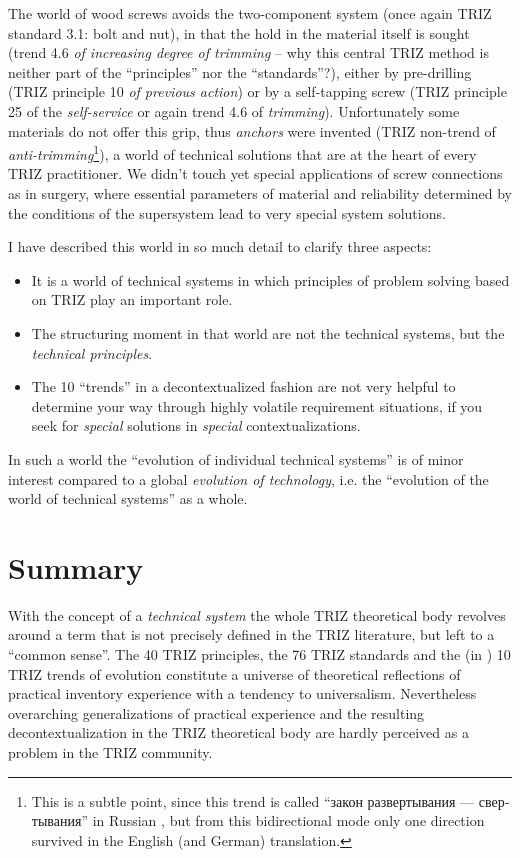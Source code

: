 \documentclass{llncs}
\begin{document}
The world of wood screws avoids the two-component system (once again TRIZ
standard 3.1: bolt and nut), in that the hold in the material itself is sought
(trend 4.6 \emph{of increasing degree of trimming} -- why this central TRIZ
method is neither part of the ``principles'' nor the ``standards''?), either
by pre-drilling (TRIZ principle 10 \emph{of previous action}) or by a
self-tapping screw (TRIZ principle 25 of the \emph{self-service} or again
trend 4.6 of \emph{trimming}). Unfortunately some materials do not offer this
grip, thus \emph{anchors} were invented (TRIZ non-trend of
\emph{anti-trimming}\footnote{This is a subtle point, since this trend is
  called ``\foreignlanguage{russian}{закон развертывания — свертывания}'' in
  Russian \cite[2.1.6]{TBK-2007}, but from this bidirectional mode only one
  direction survived in the English (and German) translation.}), a world of
technical solutions that are at the heart of every TRIZ practitioner.  We
didn't touch yet special applications of screw connections as in surgery,
where essential parameters of material and reliability determined by the
conditions of the supersystem lead to very special system solutions.

I have described this world in so much detail to clarify three aspects:
\begin{itemize}
\item [1)] It is a world of technical systems in which principles of problem
  solving based on TRIZ play an important role.
\item [2)] The structuring moment in that world are not the technical systems,
  but the \emph{technical principles}.
\item [3)] The 10 ``trends'' in a decontextualized fashion are not very
  helpful to determine your way through highly volatile requirement
  situations, if you seek for \emph{special} solutions in \emph{special}
  contextualizations.
\end{itemize}
In such a world the ``evolution of individual technical systems'' is of minor
interest compared to a global \emph{evolution of technology}, i.e. the
``evolution of the world of technical systems'' as a whole.

\section{Summary}

With the concept of a \emph{technical system} the whole TRIZ theoretical body
revolves around a term that is not precisely defined in the TRIZ literature,
but left to a ``common sense''. The 40 TRIZ principles, the 76 TRIZ standards
and the (in \cite{TESE2018}) 10 TRIZ trends of evolution constitute a universe
of theoretical reflections of practical inventory experience with a tendency
to universalism.  Nevertheless overarching generalizations of practical
experience and the resulting decontextualization in the TRIZ theoretical body
are hardly perceived as a problem in the TRIZ community.
\end{document}
